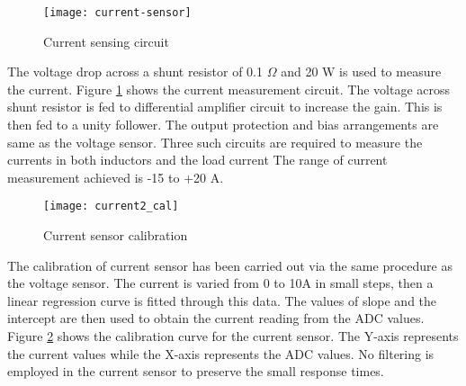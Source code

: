     \begin{figure}[h]
        \centering
        \texttt{[image: current-sensor]}
        \caption{Current sensing circuit}
        \label{fig:isens}
    \end{figure}
    The voltage drop across a shunt resistor of 0.1 $\Omega$ and 20 W is used to measure the current. Figure \ref{fig:isens} shows the current measurement circuit. The voltage across shunt resistor is fed to differential amplifier circuit to increase the gain. This is then fed to a unity follower. The output protection and bias arrangements are same as the voltage sensor. Three such circuits are required to measure the currents in both inductors and the load current The range of current measurement achieved is -15 to +20 A.
	\begin{figure}[h]
        \centering
        \texttt{[image: current2\_cal]}
        \caption{Current sensor calibration}
        \label{fig:current-cal}
    \end{figure}
	The calibration of current sensor has been carried out via the same procedure as the voltage sensor. The current is varied from 0 to 10A in small steps, then a linear regression curve is fitted through this data. The values of slope and the intercept are then used to obtain the current reading from the ADC values. Figure \ref{fig:current-cal} shows the calibration curve for the current sensor. The Y-axis represents the current values while the X-axis represents the ADC values. No filtering is employed in the current sensor to preserve the small response times.

